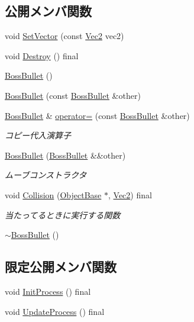 \subsection*{公開メンバ関数}
\begin{DoxyCompactItemize}
\item 
void \mbox{\hyperlink{class_boss_bullet_a29bc4989a8b16a9da0daa3da92fb0e0a}{Set\+Vector}} (const \mbox{\hyperlink{common_8h_ae148fff5818e9444b4ab2288829559bf}{Vec2}} vec2)
\item 
void \mbox{\hyperlink{class_boss_bullet_ace134e26eed55f3a839b8c6412664234}{Destroy}} () final
\item 
\mbox{\hyperlink{class_boss_bullet_acca8ecca1f90ed4454ca2bb3f20a86f9}{Boss\+Bullet}} ()
\item 
\mbox{\hyperlink{class_boss_bullet_a3fc4ad096e796b25d28e19ae8e4339bf}{Boss\+Bullet}} (const \mbox{\hyperlink{class_boss_bullet}{Boss\+Bullet}} \&other)
\item 
\mbox{\hyperlink{class_boss_bullet}{Boss\+Bullet}} \& \mbox{\hyperlink{class_boss_bullet_ab71ff0c91873433ba21e912c85800e1e}{operator=}} (const \mbox{\hyperlink{class_boss_bullet}{Boss\+Bullet}} \&other)
\begin{DoxyCompactList}\small\item\em コピー代入演算子 \end{DoxyCompactList}\item 
\mbox{\hyperlink{class_boss_bullet_a852db4124cf1985c9bb612ef8a765722}{Boss\+Bullet}} (\mbox{\hyperlink{class_boss_bullet}{Boss\+Bullet}} \&\&other)
\begin{DoxyCompactList}\small\item\em ムーブコンストラクタ \end{DoxyCompactList}\item 
void \mbox{\hyperlink{class_boss_bullet_ab742fa1d233e0df5d49cc239e24eeec3}{Collision}} (\mbox{\hyperlink{class_object_base}{Object\+Base}} $\ast$, \mbox{\hyperlink{common_8h_ae148fff5818e9444b4ab2288829559bf}{Vec2}}) final
\begin{DoxyCompactList}\small\item\em 当たってるときに実行する関数 \end{DoxyCompactList}\item 
\mbox{\hyperlink{class_boss_bullet_a387327aee4bbfba8abd6320f6f5acb35}{$\sim$\+Boss\+Bullet}} ()
\end{DoxyCompactItemize}
\subsection*{限定公開メンバ関数}
\begin{DoxyCompactItemize}
\item 
void \mbox{\hyperlink{class_boss_bullet_a8d70eb5a70dcf3d09baf646ae1bcb7f7}{Init\+Process}} () final
\item 
void \mbox{\hyperlink{class_boss_bullet_a8e9923194c03eb0d4225ed8dae409f29}{Update\+Process}} () final
\end{DoxyCompactItemize}
